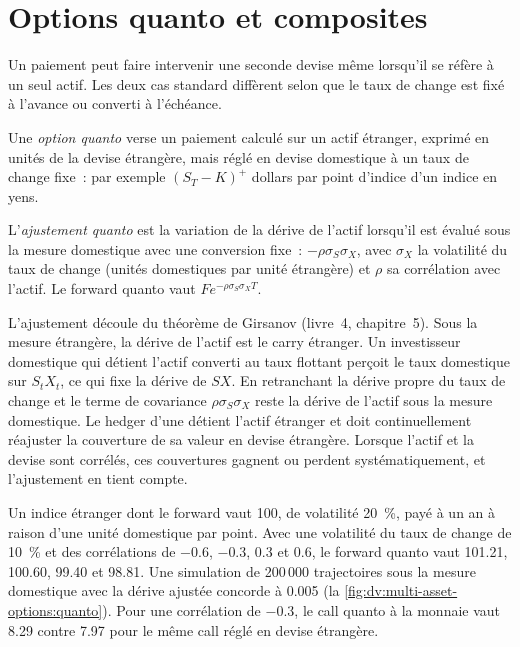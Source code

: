 \section{Options quanto et composites}

Un paiement peut faire intervenir une seconde devise même lorsqu'il se réfère à un seul actif. Les deux cas standard diffèrent selon que le
taux de change est fixé à l'avance ou converti à l'échéance.

\begin{definition}\label{def:dv:multi-asset-options:quanto}
Une \emph{option quanto} verse un paiement calculé sur un actif étranger, exprimé en unités de la devise étrangère, mais
réglé en devise domestique à un taux de change fixe~: par exemple $(S_T-K)^+$ dollars par point d'indice d'un
indice en yens.
\end{definition}

\begin{definition}\label{def:dv:multi-asset-options:quantoadj}
L'\emph{ajustement quanto} est la variation de la dérive de l'actif lorsqu'il est évalué sous la
mesure domestique avec une conversion fixe~: $-\rho\sigma_S\sigma_X$, avec $\sigma_X$ la volatilité du taux de change
(unités domestiques par unité étrangère) et $\rho$ sa corrélation avec l'actif. Le forward quanto vaut $Fe^{-\rho\sigma_S\sigma_XT}$.
\end{definition}

L'ajustement découle du théorème de Girsanov (livre~4, chapitre~5). Sous la mesure étrangère, la dérive de l'actif
est le carry étranger. Un investisseur domestique qui détient l'actif converti au taux flottant perçoit le taux domestique sur
$S_tX_t$, ce qui fixe la dérive de $SX$. En retranchant la dérive propre du taux de change et le terme de covariance
$\rho\sigma_S\sigma_X$ reste la dérive de l'actif sous la mesure domestique. Le hedger d'une  détient l'actif étranger
et doit continuellement réajuster la couverture de sa valeur en devise étrangère. Lorsque l'actif et la devise sont corrélés, ces
couvertures gagnent ou perdent systématiquement, et l'ajustement en tient compte.

\begin{example}\label{ex:dv:multi-asset-options:quanto}
Un indice étranger dont le forward vaut 100, de volatilité 20~\%, payé à un an à raison d'une unité domestique par point. Avec une
volatilité du taux de change de 10~\% et des corrélations de $-0.6$, $-0.3$, $0.3$ et $0.6$, le forward quanto vaut 101.21, 100.60,
99.40 et 98.81. Une simulation de 200\,000 trajectoires sous la mesure domestique avec la dérive ajustée concorde à 0.005
(la \cref{fig:dv:multi-asset-options:quanto}). Pour une corrélation de $-0.3$, le call quanto à la monnaie vaut 8.29 contre
7.97 pour le même call réglé en devise étrangère.
\end{example}

